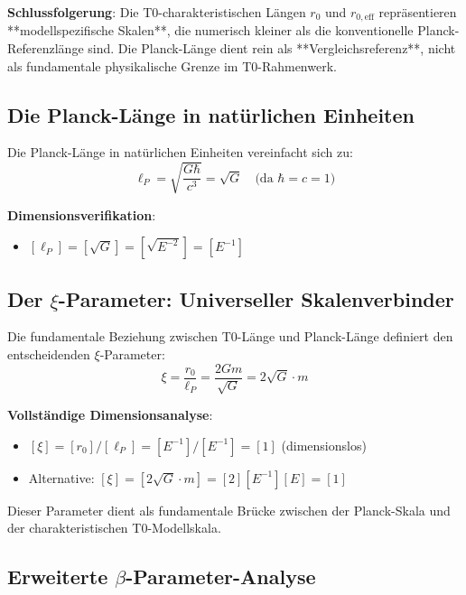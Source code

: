 \documentclass[12pt,a4paper]{article}
\begin{document}
\textbf{Schlussfolgerung}: Die T0-charakteristischen Längen $r_0$ und $r_{0,\text{eff}}$ repräsentieren **modellspezifische Skalen**, die numerisch kleiner als die konventionelle Planck-Referenzlänge sind. Die Planck-Länge dient rein als **Vergleichsreferenz**, nicht als fundamentale physikalische Grenze im T0-Rahmenwerk.

\subsection{Die Planck-Länge in natürlichen Einheiten}
\label{subsec:planck_length_natural}

Die Planck-Länge in natürlichen Einheiten vereinfacht sich zu:
\begin{equation}
	\ell_P = \sqrt{\frac{G\hbar}{c^3}} = \sqrt{G} \quad \text{(da } \hbar = c = 1\text{)}
\end{equation}

\textbf{Dimensionsverifikation}:
\begin{itemize}
	\item $[\ell_P] = [\sqrt{G}] = [\sqrt{E^{-2}}] = [E^{-1}]$ \checkmark
\end{itemize}

\subsection{Der $\xi$-Parameter: Universeller Skalenverbinder}
\label{subsec:xi_universal_connector}

Die fundamentale Beziehung zwischen T0-Länge und Planck-Länge definiert den entscheidenden $\xi$-Parameter:
\begin{equation}
	\boxed{\xi = \frac{r_0}{\ell_P} = \frac{2Gm}{\sqrt{G}} = 2\sqrt{G} \cdot m}
\end{equation}

\textbf{Vollständige Dimensionsanalyse}:
\begin{itemize}
	\item $[\xi] = [r_0]/[\ell_P] = [E^{-1}]/[E^{-1}] = [1]$ (dimensionslos) \checkmark
	\item Alternative: $[\xi] = [2\sqrt{G} \cdot m] = [2][E^{-1}][E] = [1]$ \checkmark
\end{itemize}

Dieser Parameter dient als fundamentale Brücke zwischen der Planck-Skala und der charakteristischen T0-Modellskala.

\subsection{Erweiterte $\beta$-Parameter-Analyse}
\label{subsec:beta_enhanced_analysis}
\end{document}
